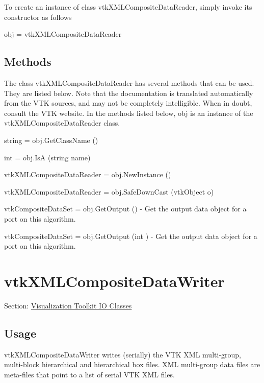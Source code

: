 To create an instance of class vtk\-X\-M\-L\-Composite\-Data\-Reader, simply invoke its constructor as follows \begin{DoxyVerb}  obj = vtkXMLCompositeDataReader
\end{DoxyVerb}
 \hypertarget{vtkwidgets_vtkxyplotwidget_Methods}{}\subsection{Methods}\label{vtkwidgets_vtkxyplotwidget_Methods}
The class vtk\-X\-M\-L\-Composite\-Data\-Reader has several methods that can be used. They are listed below. Note that the documentation is translated automatically from the V\-T\-K sources, and may not be completely intelligible. When in doubt, consult the V\-T\-K website. In the methods listed below, {\ttfamily obj} is an instance of the vtk\-X\-M\-L\-Composite\-Data\-Reader class. 
\begin{DoxyItemize}
\item {\ttfamily string = obj.\-Get\-Class\-Name ()}  
\item {\ttfamily int = obj.\-Is\-A (string name)}  
\item {\ttfamily vtk\-X\-M\-L\-Composite\-Data\-Reader = obj.\-New\-Instance ()}  
\item {\ttfamily vtk\-X\-M\-L\-Composite\-Data\-Reader = obj.\-Safe\-Down\-Cast (vtk\-Object o)}  
\item {\ttfamily vtk\-Composite\-Data\-Set = obj.\-Get\-Output ()} -\/ Get the output data object for a port on this algorithm.  
\item {\ttfamily vtk\-Composite\-Data\-Set = obj.\-Get\-Output (int )} -\/ Get the output data object for a port on this algorithm.  
\end{DoxyItemize}\hypertarget{vtkio_vtkxmlcompositedatawriter}{}\section{vtk\-X\-M\-L\-Composite\-Data\-Writer}\label{vtkio_vtkxmlcompositedatawriter}
Section\-: \hyperlink{sec_vtkio}{Visualization Toolkit I\-O Classes} \hypertarget{vtkwidgets_vtkxyplotwidget_Usage}{}\subsection{Usage}\label{vtkwidgets_vtkxyplotwidget_Usage}
vtk\-X\-M\-L\-Composite\-Data\-Writer writes (serially) the V\-T\-K X\-M\-L multi-\/group, multi-\/block hierarchical and hierarchical box files. X\-M\-L multi-\/group data files are meta-\/files that point to a list of serial V\-T\-K X\-M\-L files.

